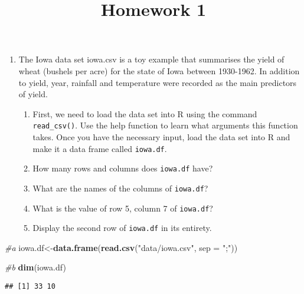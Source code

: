 \documentclass[
]{article}
\title{Homework 1}
\author{}
\date{\vspace{-2.5em}}
\newenvironment{Shaded}{\begin{snugshade}}{\end{snugshade}}
\newcommand{\CommentTok}[1]{\textcolor[rgb]{0.56,0.35,0.01}{\textit{#1}}}
\newcommand{\DataTypeTok}[1]{\textcolor[rgb]{0.13,0.29,0.53}{#1}}
\newcommand{\KeywordTok}[1]{\textcolor[rgb]{0.13,0.29,0.53}{\textbf{#1}}}
\newcommand{\NormalTok}[1]{#1}
\newcommand{\StringTok}[1]{\textcolor[rgb]{0.31,0.60,0.02}{#1}}
\providecommand{\tightlist}{%
  \setlength{\itemsep}{0pt}\setlength{\parskip}{0pt}}
\begin{document}
\maketitle

\begin{enumerate}
\def\labelenumi{\arabic{enumi}.}
\tightlist
\item
  The Iowa data set iowa.csv is a toy example that summarises the yield
  of wheat (bushels per acre) for the state of Iowa between 1930-1962.
  In addition to yield, year, rainfall and temperature were recorded as
  the main predictors of yield.

  \begin{enumerate}
  \def\labelenumii{\alph{enumii}.}
  \tightlist
  \item
    First, we need to load the data set into R using the command
    \texttt{read\_csv()}. Use the help function to learn what arguments
    this function takes. Once you have the necessary input, load the
    data set into R and make it a data frame called \texttt{iowa.df}.
  \item
    How many rows and columns does \texttt{iowa.df} have?
  \item
    What are the names of the columns of \texttt{iowa.df}?
  \item
    What is the value of row 5, column 7 of \texttt{iowa.df}?
  \item
    Display the second row of \texttt{iowa.df} in its entirety.
  \end{enumerate}
\end{enumerate}

\begin{Shaded}
\begin{Highlighting}[]
\CommentTok{#a}
\NormalTok{iowa.df<-}\KeywordTok{data.frame}\NormalTok{(}\KeywordTok{read.csv}\NormalTok{(}\StringTok{"data/iowa.csv"}\NormalTok{, }\DataTypeTok{sep =} \StringTok{";"}\NormalTok{))}
\end{Highlighting}
\end{Shaded}

\begin{Shaded}
\begin{Highlighting}[]
\CommentTok{#b}
\KeywordTok{dim}\NormalTok{(iowa.df)}
\end{Highlighting}
\end{Shaded}

\begin{verbatim}
## [1] 33 10
\end{verbatim}
\end{document}
